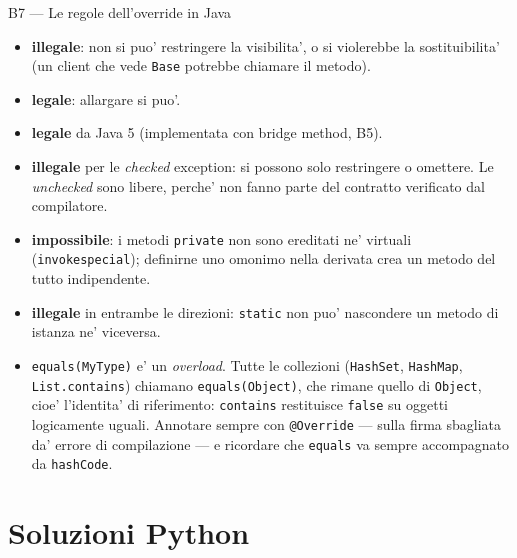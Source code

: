 \documentclass{report}
\newcommand{\code}[1]{\texttt{\small #1}}
\begin{document}
\begin{soluzione}{B7 --- Le regole dell'override in Java}
\label{sol:B7}
\begin{itemize}
    \item[(a)] \textbf{illegale}: non si puo' restringere la visibilita', o si
          violerebbe la sostituibilita' (un client che vede \code{Base} potrebbe
          chiamare il metodo).
    \item[(b)] \textbf{legale}: allargare si puo'.
    \item[(c)] \textbf{legale} da Java 5 (implementata con bridge method, B5).
    \item[(d)] \textbf{illegale} per le \emph{checked} exception: si possono
          solo restringere o omettere. Le \emph{unchecked} sono libere, perche'
          non fanno parte del contratto verificato dal compilatore.
    \item[(e)] \textbf{impossibile}: i metodi \code{private} non sono ereditati
          ne' virtuali (\code{invokespecial}); definirne uno omonimo nella
          derivata crea un metodo del tutto indipendente.
    \item[(f)] \textbf{illegale} in entrambe le direzioni: \code{static} non
          puo' nascondere un metodo di istanza ne' viceversa.
    \item[(g)] \code{equals(MyType)} e' un \emph{overload}. Tutte le collezioni
          (\code{HashSet}, \code{HashMap}, \code{List.contains}) chiamano
          \code{equals(Object)}, che rimane quello di \code{Object}, cioe'
          l'identita' di riferimento: \code{contains} restituisce \code{false}
          su oggetti logicamente uguali. Annotare sempre con \code{@Override}
          --- sulla firma sbagliata da' errore di compilazione --- e ricordare
          che \code{equals} va sempre accompagnato da \code{hashCode}.
\end{itemize}
\end{soluzione}

\section{Soluzioni Python}
\end{document}
